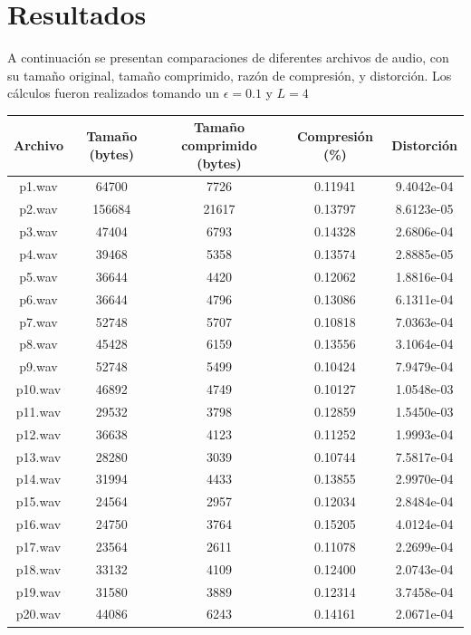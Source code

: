 \documentclass[a4paper,11pt]{article}
\begin{document}
\section{Resultados}
A continuación se presentan comparaciones de diferentes archivos de audio, con
su tamaño original, tamaño comprimido, razón de compresión, y distorción. Los cálculos fueron realizados tomando un $\epsilon = 0.1$ y $L = 4$
\begin{center}
    \begin{tabular}{c | c | c | c | c}
        \hline
        Archivo & Tamaño (bytes) & Tamaño comprimido (bytes) & Compresión (\%) &  Distorción \\ \hline
        p1.wav & 64700 & 7726 & 0.11941 & 9.4042e-04 \\
        p2.wav & 156684 & 21617 & 0.13797 & 8.6123e-05 \\
        p3.wav & 47404 & 6793 & 0.14328 & 2.6806e-04 \\
        p4.wav & 39468 & 5358 & 0.13574 & 2.8885e-05 \\
        p5.wav & 36644 & 4420 & 0.12062 & 1.8816e-04 \\
        p6.wav & 36644 & 4796 & 0.13086 & 6.1311e-04 \\
        p7.wav & 52748 & 5707 & 0.10818 & 7.0363e-04 \\
        p8.wav & 45428 & 6159 & 0.13556 & 3.1064e-04 \\
        p9.wav & 52748 & 5499 & 0.10424 & 7.9479e-04 \\
        p10.wav & 46892 & 4749 & 0.10127 & 1.0548e-03 \\
        p11.wav & 29532 & 3798 & 0.12859 & 1.5450e-03 \\
        p12.wav & 36638 & 4123 & 0.11252 & 1.9993e-04 \\
        p13.wav & 28280 & 3039 & 0.10744 & 7.5817e-04\\
        p14.wav & 31994 & 4433 & 0.13855 & 2.9970e-04\\
        p15.wav & 24564 & 2957 & 0.12034 & 2.8484e-04 \\
        p16.wav & 24750 & 3764 & 0.15205 & 4.0124e-04\\
        p17.wav & 23564 & 2611 & 0.11078 & 2.2699e-04\\
        p18.wav & 33132 & 4109 & 0.12400 & 2.0743e-04 \\
        p19.wav & 31580 & 3889 & 0.12314 & 3.7458e-04\\
        p20.wav & 44086 & 6243 & 0.14161 & 2.0671e-04\\

\end{tabular}
\end{center}
\end{document}
